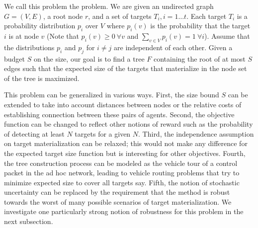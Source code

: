 We call this problem the  problem.  We are given an undirected graph $G =
(V,E)$, a root node $r$, and a set of targets $T_i, i = 1 \ldots
t$. Each target $T_i$ is a probability distribution $p_i$ over $V$
where $p_i(v)$ is the probability that the target $i$ is at node $v$
(Note that $p_i(v) \geq 0 \ \forall v$ and $\sum_{v \in V} p_i(v) = 1
\ \forall i$). Assume that the distributions $p_i$ and $p_j$ for $i
\neq j$ are independent of each other. Given a budget $S$ on the size, our
goal is to find a tree $F$ containing the root of at most $S$ edges
such that the expected size of the targets that materialize in the
node set of the tree is maximized.

This problem can be generalized in various ways. First, the size bound
$S$ can be extended to take into account distances between nodes or
the relative costs of establishing connection between these pairs of
agents. Second, the objective function can be changed to reflect other
notions of reward such as the probability of detecting at least $N$
targets for a given $N$. Third, the independence assumption on target
materialization can be relaxed; this would not make any difference for
the expected target size function but is interesting for other
objectives. Fourth, the tree construction process can be modeled as
the vehicle tour of a control packet in the ad hoc network, leading to
vehicle routing problems that try to minimize expected size to cover
all targets say. Fifth, the notion of stochastic uncertainty can be
replaced by the requirement that the method is robust towards the
worst of many possible scenarios of target materialization. We
investigate one particularly strong notion of robustness for this
problem in the next subsection.


